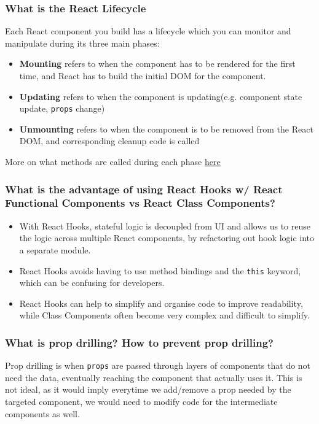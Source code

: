 \documentclass[12pt, a4paper]{article}
\newcommand{\code}[1]{\texttt{#1}}
\begin{document}
\subsubsection*{What is the React Lifecycle}
Each React component you build has a lifecycle which you can monitor and manipulate during its three main phases:
\begin{itemize}
  \item \textbf{Mounting} refers to when the component has to be rendered for the first time, and React has to build the initial DOM for the component.
  \item \textbf{Updating} refers to when the component is updating(e.g. component state update, \code{props} change)
  \item \textbf{Unmounting} refers to when the component is to be removed from the React DOM, and corresponding cleanup code is called
\end{itemize}

More on what methods are called during each phase \href{https://www.w3schools.com/react/react_lifecycle.asp}{here}

\subsubsection*{What is the advantage of using React Hooks w/ React Functional Components vs React Class Components?}
\begin{itemize}
  \item With React Hooks, stateful logic is decoupled from UI and allows us to reuse the logic across multiple React components, by refactoring out hook logic into a separate module.
  \item React Hooks avoids having to use method bindings and the \code{this} keyword, which can be confusing for developers.
  \item React Hooks can help to simplify and organise code to improve readability, while Class Components often become very complex and difficult to simplify.
\end{itemize}

\subsubsection*{What is prop drilling? How to prevent prop drilling?}
Prop drilling is when \code{props} are passed through layers of components that do not need the data, eventually reaching the component that actually uses it.
This is not ideal, as it would imply everytime we add/remove a prop needed by the targeted component, we would need to modify code for the intermediate components as well.
\end{document}
